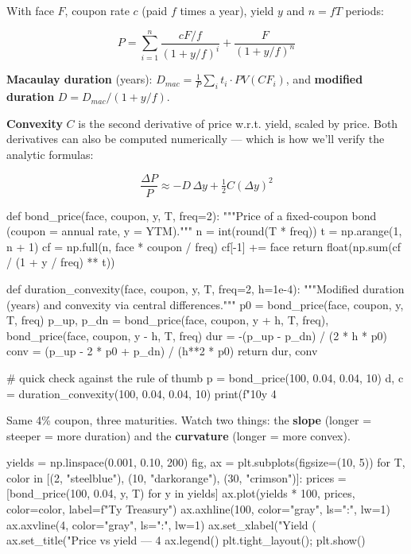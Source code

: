 \documentclass{pyportfolios-note}
\begin{document}
\noteneedroom{190bp}

With face $F$, coupon rate $c$ (paid $f$ times a year), yield $y$ and
$n = fT$ periods:

\[ P = \sum_{i=1}^{n} \frac{cF/f}{(1+y/f)^i} + \frac{F}{(1+y/f)^n} \]

\textbf{Macaulay duration} (years):
$D_{mac} = \frac{1}{P}\sum_i t_i \cdot PV(CF_i)$, and \textbf{modified duration}
$D = D_{mac}/(1+y/f)$.

\textbf{Convexity} $C$ is the second derivative of price w.r.t. yield, scaled by
price. Both derivatives can also be computed numerically — which is how we'll
verify the analytic formulas:

\[ \frac{\Delta P}{P} \approx -D\,\Delta y + \tfrac{1}{2} C (\Delta y)^2 \]

\begin{notecode}
def bond_price(face, coupon, y, T, freq=2):
    """Price of a fixed-coupon bond (coupon = annual rate, y = YTM)."""
    n = int(round(T * freq))
    t = np.arange(1, n + 1)
    cf = np.full(n, face * coupon / freq)
    cf[-1] += face
    return float(np.sum(cf / (1 + y / freq) ** t))

def duration_convexity(face, coupon, y, T, freq=2, h=1e-4):
    """Modified duration (years) and convexity via central differences."""
    p0 = bond_price(face, coupon, y, T, freq)
    p_up, p_dn = bond_price(face, coupon, y + h, T, freq), bond_price(face, coupon, y - h, T, freq)
    dur  = -(p_up - p_dn) / (2 * h * p0)
    conv =  (p_up - 2 * p0 + p_dn) / (h**2 * p0)
    return dur, conv

# quick check against the rule of thumb
p = bond_price(100, 0.04, 0.04, 10)
d, c = duration_convexity(100, 0.04, 0.04, 10)
print(f"10y 4%
\end{notecode}

\noteneedroom{200bp}


Same 4\% coupon, three maturities. Watch two things: the \textbf{slope} (longer =
steeper = more duration) and the \textbf{curvature} (longer = more convex).

\begin{notecode}
yields = np.linspace(0.001, 0.10, 200)
fig, ax = plt.subplots(figsize=(10, 5))
for T, color in [(2, "steelblue"), (10, "darkorange"), (30, "crimson")]:
    prices = [bond_price(100, 0.04, y, T) for y in yields]
    ax.plot(yields * 100, prices, color=color, label=f"{T}y Treasury")
ax.axhline(100, color="gray", ls=":", lw=1)
ax.axvline(4, color="gray", ls=":", lw=1)
ax.set_xlabel("Yield (%
ax.set_title("Price vs yield — 4%
ax.legend()
plt.tight_layout(); plt.show()
\end{notecode}
\end{document}
